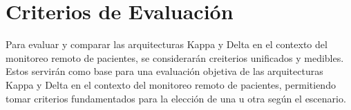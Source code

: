\section{Criterios de Evaluación}

Para evaluar y comparar las arquitecturas Kappa y Delta en el contexto del monitoreo remoto de pacientes, se considerarán creiterios unificados y medibles.
Estos servirán como base para una evaluación objetiva de las arquitecturas Kappa y Delta en el contexto del monitoreo remoto de pacientes, permitiendo tomar criterios 
fundamentados para la elección de una u otra según el escenario.




\newpage


\newpage